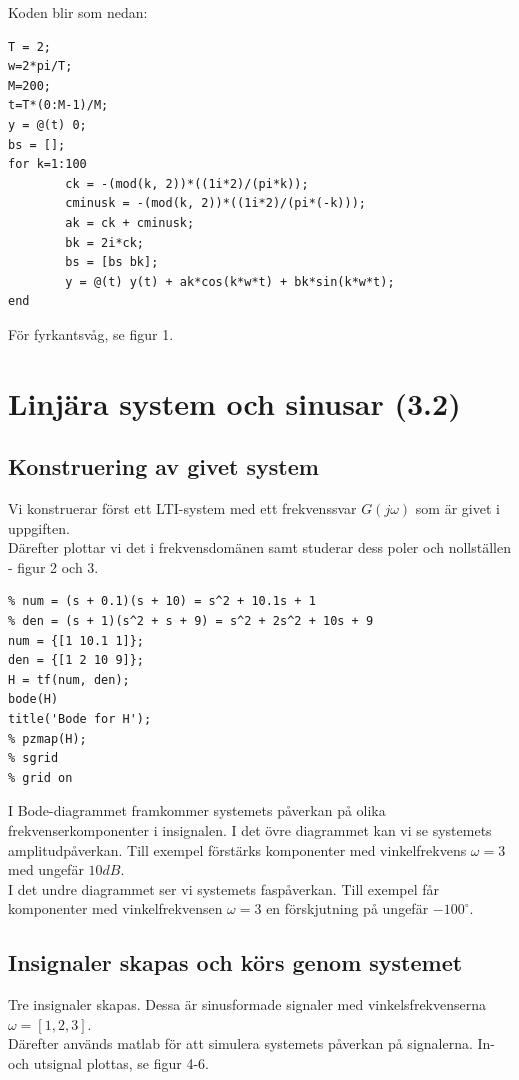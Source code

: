 \documentclass[]{article}
\begin{document}
Koden blir som nedan:

\begin{verbatim}
T = 2;
w=2*pi/T;
M=200;
t=T*(0:M-1)/M;
y = @(t) 0;
bs = [];
for k=1:100
		ck = -(mod(k, 2))*((1i*2)/(pi*k));
		cminusk = -(mod(k, 2))*((1i*2)/(pi*(-k)));
		ak = ck + cminusk;
		bk = 2i*ck;
		bs = [bs bk];
		y = @(t) y(t) + ak*cos(k*w*t) + bk*sin(k*w*t);
end
\end{verbatim}

För fyrkantsvåg, se figur 1.

\section{Linjära system och sinusar (3.2)} %
\subsection{Konstruering av givet system} %
\label{sub:konstruering_av_givet_system}
Vi konstruerar först ett LTI-system med ett frekvenssvar $G(j\omega)$ som är givet i uppgiften. \\
Därefter plottar vi det i frekvensdomänen samt studerar dess poler och nollställen - figur 2 och 3.
\begin{verbatim}
% num = (s + 0.1)(s + 10) = s^2 + 10.1s + 1
% den = (s + 1)(s^2 + s + 9) = s^2 + 2s^2 + 10s + 9
num = {[1 10.1 1]};
den = {[1 2 10 9]};
H = tf(num, den);
bode(H)
title('Bode for H');
% pzmap(H);
% sgrid
% grid on
\end{verbatim}

I Bode-diagrammet framkommer systemets påverkan på olika frekvenserkomponenter i insignalen. I det övre diagrammet kan vi se systemets amplitudpåverkan. Till exempel förstärks komponenter med vinkelfrekvens $\omega = 3$ med ungefär $10dB$. \\
I det undre diagrammet ser vi systemets faspåverkan. Till exempel får komponenter med vinkelfrekvensen $\omega = 3$ en förskjutning på ungefär $-100^\circ$.


\subsection{Insignaler skapas och körs genom systemet} %
\label{sub:insignal}

Tre insignaler skapas. Dessa är sinusformade signaler med vinkelsfrekvenserna $\omega = [1,2,3]$. \\
Därefter används matlab för att simulera systemets påverkan på signalerna. In- och utsignal plottas, se figur 4-6.
\end{document}
